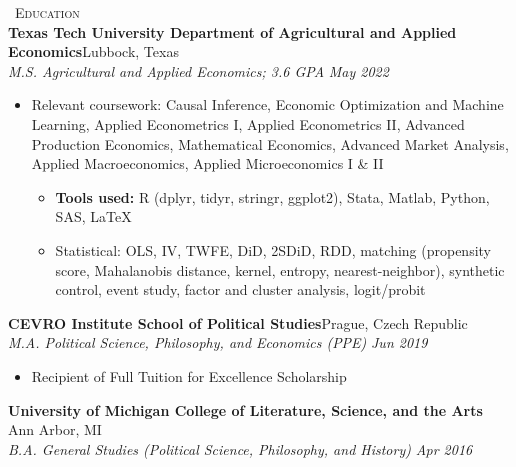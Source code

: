 \documentclass[a4paper,11pt]{article}
\newcommand{\header} [1] {
    \vspace{1mm}
    {\textsc{\large{\xrfill[0.5ex]{0.5pt}~#1~\xrfill[0.5ex]{0.5pt}}}} %
}
\begin{document}

\header{Education} \\
\vspace{1mm}
\textbf{Texas Tech University Department of Agricultural and Applied Economics}\hfill Lubbock, Texas\\
\textit{M.S. Agricultural and Applied Economics; 3.6 GPA} \hfill  \emph{May 2022} \\
\begin{itemize}
    \item Relevant coursework: Causal Inference, Economic Optimization and Machine Learning, Applied Econometrics I, Applied Econometrics II, Advanced Production Economics, Mathematical Economics, Advanced Market Analysis, Applied Macroeconomics, Applied Microeconomics I \& II
    \begin{itemize}
        \item \textbf{Tools used:} R (dplyr, tidyr, stringr, ggplot2), Stata, Matlab, Python, SAS, \LaTeX
        \item Statistical: OLS, IV, TWFE, DiD, 2SDiD, RDD, matching (propensity score, Mahalanobis distance, kernel, entropy, nearest-neighbor), synthetic control, event study, factor and cluster analysis, logit/probit
    \end{itemize}
\end{itemize}
\vspace{1mm}

\textbf{CEVRO Institute School of Political Studies}\hfill Prague, Czech Republic\\
\textit{M.A. Political Science, Philosophy, and Economics (PPE)} \hfill  \emph{Jun 2019}\\
\begin{itemize}
    \item Recipient of Full Tuition for Excellence Scholarship
\end{itemize}
\vspace{1mm}

\textbf{University of Michigan College of Literature, Science, and the Arts} \hfill Ann Arbor, MI\\
\textit{B.A. General Studies (Political Science, Philosophy, and History)} \hfill  \emph{Apr 2016}\\

\vspace{1mm}
\end{document}
